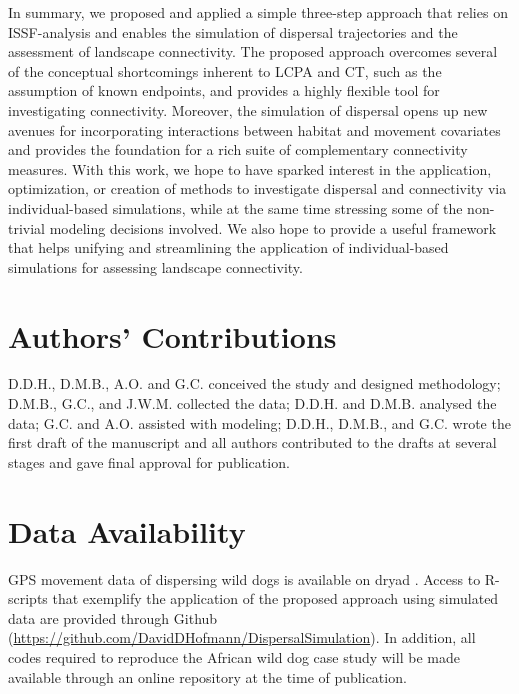 \documentclass[abstract=on,10pt,a4paper,bibliography=totocnumbered]{article}
\begin{document}
In summary, we proposed and applied a simple three-step approach that relies on
ISSF-analysis and enables the simulation of dispersal trajectories and the
assessment of landscape connectivity. The proposed approach overcomes several of
the conceptual shortcomings inherent to LCPA and CT, such as the assumption of
known endpoints, and provides a highly flexible tool for investigating
connectivity. Moreover, the simulation of dispersal opens up new avenues for
incorporating interactions between habitat and movement covariates and provides
the foundation for a rich suite of complementary connectivity measures. With
this work, we hope to have sparked interest in the application, optimization, or
creation of methods to investigate dispersal and connectivity via
individual-based simulations, while at the same time stressing some of the
non-trivial modeling decisions involved. We also hope to provide a useful
framework that helps unifying and streamlining the application of
individual-based simulations for assessing landscape connectivity.

\section{Authors' Contributions}
D.D.H., D.M.B., A.O. and G.C. conceived the study and designed methodology;
D.M.B., G.C., and J.W.M. collected the data; D.D.H. and D.M.B. analysed the
data; G.C. and A.O. assisted with modeling; D.D.H., D.M.B., and G.C. wrote the
first draft of the manuscript and all authors contributed to the drafts at
several stages and gave final approval for publication.

\section{Data Availability}
GPS movement data of dispersing wild dogs is available on dryad
\citep{Hofmann.2021b}. Access to R-scripts that exemplify the application of the
proposed approach using simulated data are provided through Github
(\url{https://github.com/DavidDHofmann/DispersalSimulation}). In addition, all
codes required to reproduce the African wild dog case study will be made
available through an online repository at the time of publication.
\end{document}
